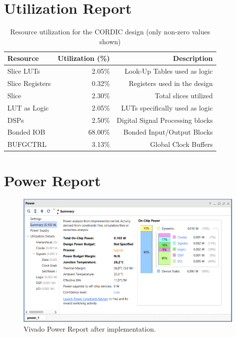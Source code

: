 \section{Utilization Report}
\begin{table}[ht]
    \centering
    \small
    \captionsetup{skip=10pt} 
    \begin{tabular}{lrr}
        \hline
        Resource               & Utilization (\%) & Description \\
        \hline
        Slice LUTs             & 2.05\%           & Look-Up Tables used as logic \\
        Slice Registers        & 0.32\%           & Registers used in the design \\
        Slice                  & 2.30\%           & Total slices utilized \\
        LUT as Logic           & 2.05\%           & LUTs specifically used as logic \\
        DSPs                   & 2.50\%           & Digital Signal Processing blocks \\
        Bonded IOB             & 68.00\%          & Bonded Input/Output Blocks \\
        BUFGCTRL               & 3.13\%           & Global Clock Buffers \\
        \hline
    \end{tabular}
    \caption{Resource utilization for the CORDIC design (only non-zero values shown)}
    \label{tab:cordic_resource_utilization}
\end{table}


\section{Power Report}
\begin{figure}[H]
    \centering
    \captionsetup{skip=10pt} 
    \includegraphics[width=\textwidth]{./images/Vivado/power_report.png}
    \caption{Vivado Power Report after implementation.}
    \label{fig:power_report}
\end{figure}